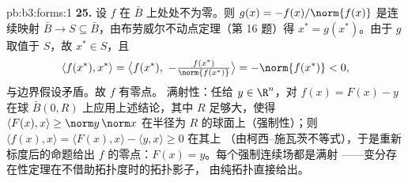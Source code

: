 \begin{solution}{pb:b3:forms:1}
\textbf{25.} 设 $f$ 在 $\bar B$ 上处处不为零。则
$g(x) = -f(x)/\norm{f(x)}$ 是连续映射 $\bar B \to S
\subseteq \bar B$，由布劳威尔不动点定理（第 16 题）得 $x^* =
g(x^*)$。由于 $g$ 取值于 $S$，故 $x^* \in S$，且
\[
\langle f(x^*), x^*\rangle = \bigl\langle f(x^*),\
-\tfrac{f(x^*)}{\norm{f(x^*)}}\bigr\rangle
= -\norm{f(x^*)} < 0,
\]
与边界假设矛盾。故 $f$ 有零点。
满射性：任给 $y \in \R^n$，对 $f(x) =
F(x) - y$ 在球 $\bar B(0, R)$ 上应用上述结论，其中 $R$ 足够大，使得
$\langle F(x), x\rangle \geq \norm y\,\norm x$ 在半径为
$R$ 的球面上（强制性）；则 $\langle f(x), x\rangle =
\langle F(x), x\rangle - \langle y, x\rangle \geq 0$ 在其上
（由柯西–施瓦茨不等式），于是重新标度后的命题给出
$f$ 的零点：$F(x) = y$。每个强制连续场都是满射
——变分存在性定理在不借助拓扑度时的拓扑影子，
由纯拓扑直接给出。
\end{solution}
